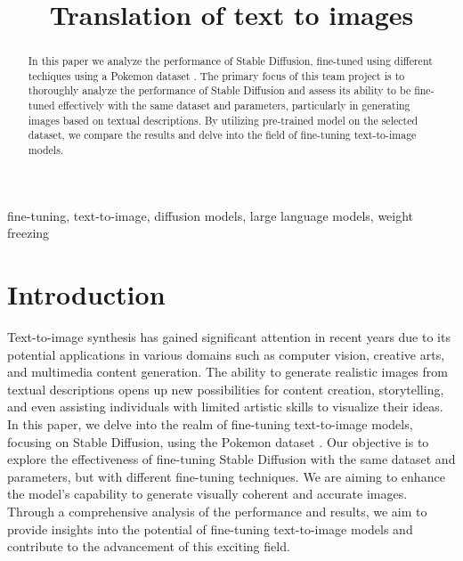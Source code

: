 \documentclass[conference]{IEEEtran}
\begin{document}
\title{Translation of text to images}
\author{
\and
{}
}
\maketitle

\begin{abstract}
In this paper we analyze the performance of Stable Diffusion, fine-tuned using different techiques using a Pokemon dataset \cite{pinkney2022pokemon}. The primary focus of this team project is to thoroughly analyze the performance of Stable Diffusion and assess its ability to be fine-tuned effectively with the same dataset and parameters, particularly in generating images based on textual descriptions. By utilizing pre-trained model on the selected dataset, we compare the results and delve into the field of fine-tuning text-to-image models.
\end{abstract}

\begin{IEEEkeywords}
fine-tuning, text-to-image, diffusion models, large language models, weight freezing
\end{IEEEkeywords}

\section{Introduction}
Text-to-image synthesis has gained significant attention in recent years due to its potential applications in various domains such as computer vision, creative arts, and multimedia content generation. The ability to generate realistic images from textual descriptions opens up new possibilities for content creation, storytelling, and even assisting individuals with limited artistic skills to visualize their ideas. In this paper, we delve into the realm of fine-tuning text-to-image models, focusing on Stable Diffusion, using the Pokemon dataset \cite{pinkney2022pokemon}. Our objective is to explore the effectiveness of fine-tuning Stable Diffusion with the same dataset and parameters, but with different fine-tuning techniques. We are aiming to enhance the model's capability to generate visually coherent and accurate images. Through a comprehensive analysis of the performance and results, we aim to provide insights into the potential of fine-tuning text-to-image models and contribute to the advancement of this exciting field.
\end{document}
